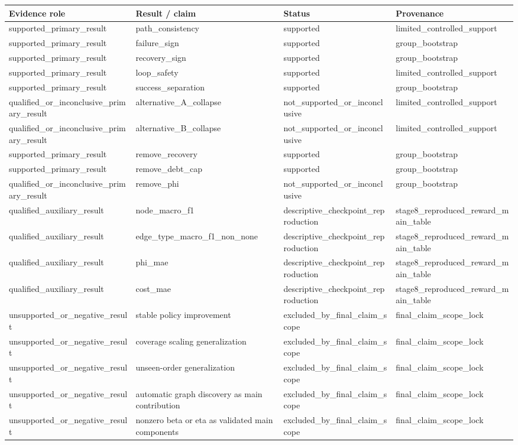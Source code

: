 \begin{tabular}{llll}
\toprule
Evidence role & Result / claim & Status & Provenance \\
\midrule
supported\_primary\_result & path\_consistency & supported & limited\_controlled\_support \\
supported\_primary\_result & failure\_sign & supported & group\_bootstrap \\
supported\_primary\_result & recovery\_sign & supported & group\_bootstrap \\
supported\_primary\_result & loop\_safety & supported & limited\_controlled\_support \\
supported\_primary\_result & success\_separation & supported & group\_bootstrap \\
qualified\_or\_inconclusive\_primary\_result & alternative\_A\_collapse & not\_supported\_or\_inconclusive & limited\_controlled\_support \\
qualified\_or\_inconclusive\_primary\_result & alternative\_B\_collapse & not\_supported\_or\_inconclusive & limited\_controlled\_support \\
supported\_primary\_result & remove\_recovery & supported & group\_bootstrap \\
supported\_primary\_result & remove\_debt\_cap & supported & group\_bootstrap \\
qualified\_or\_inconclusive\_primary\_result & remove\_phi & not\_supported\_or\_inconclusive & group\_bootstrap \\
qualified\_auxiliary\_result & node\_macro\_f1 & descriptive\_checkpoint\_reproduction & stage8\_reproduced\_reward\_main\_table \\
qualified\_auxiliary\_result & edge\_type\_macro\_f1\_non\_none & descriptive\_checkpoint\_reproduction & stage8\_reproduced\_reward\_main\_table \\
qualified\_auxiliary\_result & phi\_mae & descriptive\_checkpoint\_reproduction & stage8\_reproduced\_reward\_main\_table \\
qualified\_auxiliary\_result & cost\_mae & descriptive\_checkpoint\_reproduction & stage8\_reproduced\_reward\_main\_table \\
unsupported\_or\_negative\_result & stable policy improvement & excluded\_by\_final\_claim\_scope & final\_claim\_scope\_lock \\
unsupported\_or\_negative\_result & coverage scaling generalization & excluded\_by\_final\_claim\_scope & final\_claim\_scope\_lock \\
unsupported\_or\_negative\_result & unseen-order generalization & excluded\_by\_final\_claim\_scope & final\_claim\_scope\_lock \\
unsupported\_or\_negative\_result & automatic graph discovery as main contribution & excluded\_by\_final\_claim\_scope & final\_claim\_scope\_lock \\
unsupported\_or\_negative\_result & nonzero beta or eta as validated main components & excluded\_by\_final\_claim\_scope & final\_claim\_scope\_lock \\
\bottomrule
\end{tabular}

